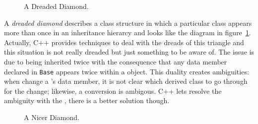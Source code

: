 \newpage
{}
\noindent{}
\begin{figure}%
\centering{}
    \caption{A Dreaded Diamond.}
    \label{fig:dreaded-diamond}
\end{figure}%

A \textit{dreaded diamond} describes a class structure in which a 
particular class appears more than once in an inheritance hierarcy 
and looks like the diagram in figure~\ref{fig:dreaded-diamond}.
\newline
Actually, C++ provides techniques to deal with the dreads of this 
triangle and this situation is not really dreaded but just something to 
be aware of.
\newline
The issue is due to  being inherited 
twice with the consequence that any data member declared in 
\texttt{Base} appears twice within a  object.
\newline
This duality creates ambiguities: when  
change a 's data member, it is not clear which derived 
class to go through for the change; likewise, a conversion 
 is ambigous.
\newline
C++ lets resolve the ambiguity with the , 
there is a better solution though.
\newpage
{}

\begin{figure}%
\begin{center}
    \caption{A Nicer Diamond.}
    \label{fig:undreaded-diamond}
\end{center}
\end{figure}%

